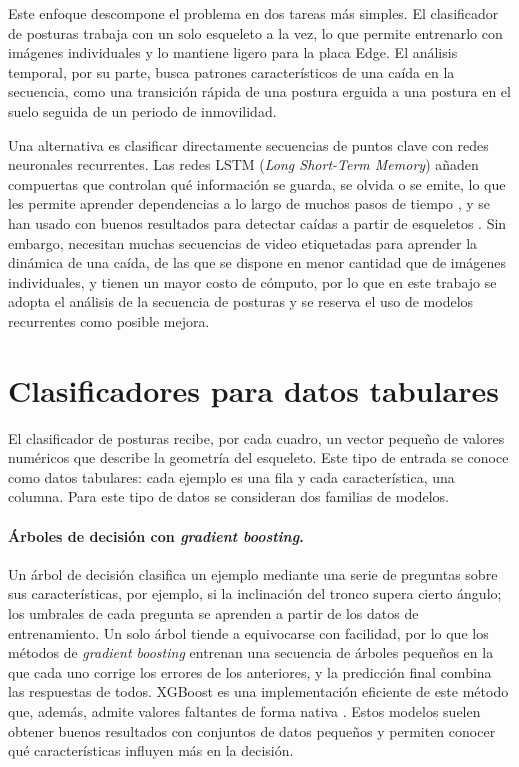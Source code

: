 \documentclass[12pt,a4paper,oneside]{book}
\theoremstyle{plain}
\theoremstyle{definition}
\theoremstyle{remark}
\begin{document}
Este enfoque descompone el problema en dos tareas más simples. El clasificador de posturas trabaja con un solo esqueleto a la vez, lo que permite entrenarlo con imágenes individuales y lo mantiene ligero para la placa Edge. El análisis temporal, por su parte, busca patrones característicos de una caída en la secuencia, como una transición rápida de una postura erguida a una postura en el suelo seguida de un periodo de inmovilidad.
 
Una alternativa es clasificar directamente secuencias de puntos clave con redes neuronales recurrentes. Las redes LSTM (\textit{Long Short-Term Memory}) añaden compuertas que controlan qué información se guarda, se olvida o se emite, lo que les permite aprender dependencias a lo largo de muchos pasos de tiempo \parencite{hochreiter1997lstm}, y se han usado con buenos resultados para detectar caídas a partir de esqueletos \parencite{lin2021openpose,mobasheri2022fall}. Sin embargo, necesitan muchas secuencias de video etiquetadas para aprender la dinámica de una caída, de las que se dispone en menor cantidad que de imágenes individuales, y tienen un mayor costo de cómputo, por lo que en este trabajo se adopta el análisis de la secuencia de posturas y se reserva el uso de modelos recurrentes como posible mejora.

\section{Clasificadores para datos tabulares}
\label{sec:clasificadores}

El clasificador de posturas recibe, por cada cuadro, un vector pequeño de valores numéricos que describe la geometría del esqueleto. Este tipo de entrada se conoce como datos tabulares: cada ejemplo es una fila y cada característica, una columna. Para este tipo de datos se consideran dos familias de modelos.

\paragraph{Árboles de decisión con \textit{gradient boosting}.} Un árbol de decisión clasifica un ejemplo mediante una serie de preguntas sobre sus características, por ejemplo, si la inclinación del tronco supera cierto ángulo; los umbrales de cada pregunta se aprenden a partir de los datos de entrenamiento. Un solo árbol tiende a equivocarse con facilidad, por lo que los métodos de \textit{gradient boosting} entrenan una secuencia de árboles pequeños en la que cada uno corrige los errores de los anteriores, y la predicción final combina las respuestas de todos. XGBoost es una implementación eficiente de este método que, además, admite valores faltantes de forma nativa \parencite{chen2016xgboost}. Estos modelos suelen obtener buenos resultados con conjuntos de datos pequeños y permiten conocer qué características influyen más en la decisión.
\end{document}

